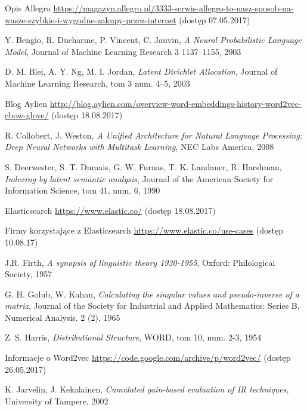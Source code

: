 \documentclass[pl]{minipw} %
\begin{document}
\begin{thebibliography}{30}
		Opis Allegro
		\url{https://magazyn.allegro.pl/3333-serwis-allegro-to-nasz-sposob-na-wasze-szybkie-i-wygodne-zakupy-przez-internet}
		(dostęp 07.05.2017)
	
		Y. Bengio, R. Ducharme, P. Vincent, C. Jauvin,
		\emph{A Neural Probabilistic Language Model},
		Journal of Machine Learning Research 3 1137–1155,
		2003
	
		D. M. Blei, A. Y. Ng, M. I. Jordan,
		\emph{Latent Dirichlet Allocation},
		Journal of Machine Learning Research, tom 3 num. 4–5,
		2003
		
		Blog Aylien
		\url{http://blog.aylien.com/overview-word-embeddings-history-word2vec-cbow-glove/}
		(dostęp 18.08.2017)
	
		R. Collobert, J. Weston,
		\emph{A Unified Architecture for Natural Language Processing: Deep Neural Networks with Multitask Learning},
		NEC Labs America,
		2008
	
		S. Deerwester, S. T. Dumais, G. W. Furnas, T. K. Landauer, R. Harshman,
		\emph{Indexing by latent semantic analysis},
		Journal of the American Society for Information Science, tom 41, num. 6,
		1990
	
		Elasticsearch
		\url{https://www.elastic.co/}
		(dostęp 18.08.2017)
	
		Firmy korzystające z Elasticsearch
		\url{https://www.elastic.co/use-cases}
		(dostęp 10.08.17)
	
		J.R. Firth,
		\emph{A synopsis of linguistic theory 1930-1955},
		Oxford: Philological Society,
		1957
	
		G. H. Golub, W. Kahan,
		\emph{Calculating the singular values and pseudo-inverse of a matrix},
		Journal of the Society for Industrial and Applied Mathematics: Series B, Numerical Analysis. 2 (2),
		1965
	
		Z. S. Harris,
		\emph{Distributional Structure},
		WORD, tom 10, num. 2-3,
		1954
	
		Informacje o Word2vec
		\url{https://code.google.com/archive/p/word2vec/}
		(dostęp 26.05.2017)
	
		K. Jarvelin, J. Kekalainen,
		\emph{Cumulated gain-based evaluation of IR techniques},
		University of Tampere,
		2002
	

\end{thebibliography}
\end{document}
